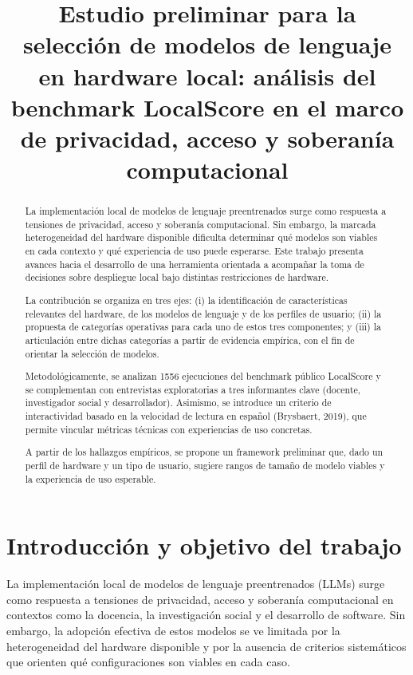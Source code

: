 \documentclass{llncs}
\title{Estudio preliminar para la selección de modelos de lenguaje en hardware local: análisis del benchmark LocalScore en el marco de privacidad, acceso y soberanía computacional}
\begin{document}
\maketitle 

\begin{abstract}
La implementación local de modelos de lenguaje preentrenados surge como respuesta a tensiones de privacidad, acceso y soberanía computacional. Sin embargo, la marcada heterogeneidad del hardware disponible dificulta determinar qué modelos son viables en cada contexto y qué experiencia de uso puede esperarse. Este trabajo presenta avances hacia el desarrollo de una herramienta orientada a acompañar la toma de decisiones sobre despliegue local bajo distintas restricciones de hardware.

La contribución se organiza en tres ejes: (i) la identificación de características relevantes del hardware, de los modelos de lenguaje y de los perfiles de usuario; (ii) la propuesta de categorías operativas para cada uno de estos tres componentes; y (iii) la articulación entre dichas categorías a partir de evidencia empírica, con el fin de orientar la selección de modelos.

Metodológicamente, se analizan 1556 ejecuciones del benchmark público LocalScore y se complementan con entrevistas exploratorias a tres informantes clave (docente, investigador social y desarrollador). Asimismo, se introduce un criterio de interactividad basado en la velocidad de lectura en español (Brysbaert, 2019), que permite vincular métricas técnicas con experiencias de uso concretas.

A partir de los hallazgos empíricos, se propone un framework preliminar que, dado un perfil de hardware y un tipo de usuario, sugiere rangos de tamaño de modelo viables y la experiencia de uso esperable.
\end{abstract}

\section{Introducción y objetivo del trabajo}\label{introduccion}

La implementación local de modelos de lenguaje preentrenados (LLMs) surge como respuesta a tensiones de privacidad, acceso y soberanía computacional en contextos como la docencia, la investigación social y el desarrollo de software. Sin embargo, la adopción efectiva de estos modelos se ve limitada por la heterogeneidad del hardware disponible y por la ausencia de criterios sistemáticos que orienten qué configuraciones son viables en cada caso.
\end{document}
